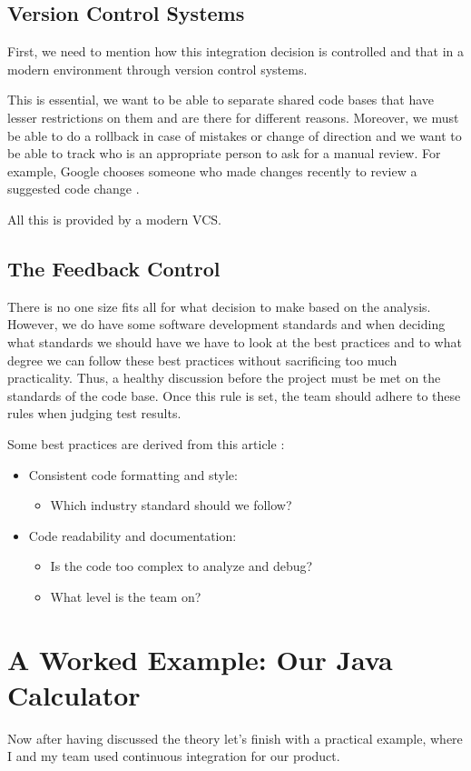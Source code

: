 \documentclass{article}
\begin{document}
\subsection{Version Control Systems}
First, we need to mention how this integration decision is controlled and that in a modern environment through
version control systems. 

This is essential, we want to be able to separate shared code bases that have lesser restrictions on them
and are there for different reasons. Moreover, we must be able to do a rollback in case of mistakes or change of direction
and we want to be able to track who is an appropriate person to ask
for a manual review. For example, Google chooses someone who made changes recently to review a suggested code change \cite{sadowski_modern_2018}.

All this is provided by a modern VCS. \cite{noauthor_version_2018}

\subsection{The Feedback Control}
There is no one size fits all for what decision to make based on the analysis. However, we do have
some software development standards and when deciding what standards we should have we have to look at the
best practices and to what degree we can follow these best practices without sacrificing too much practicality.
Thus, a healthy discussion before the project must be met on the standards of the code base. Once this rule is set, the
team should adhere to these rules when judging test results.

Some best practices are derived from this article \cite{noauthor_standards_nodate}:
\begin{itemize}
    \item Consistent code formatting and style:
    \begin{itemize}
        \item Which industry standard should we follow?
    \end{itemize}
    \item Code readability and documentation:
    \begin{itemize}
        \item Is the code too complex to analyze and debug?
        \item What level is the team on? 
    \end{itemize}
\end{itemize}
\section{A Worked Example: Our Java Calculator}
Now after having discussed the theory let's finish with a practical example, where I and my team used
continuous integration for our product.
\end{document}
